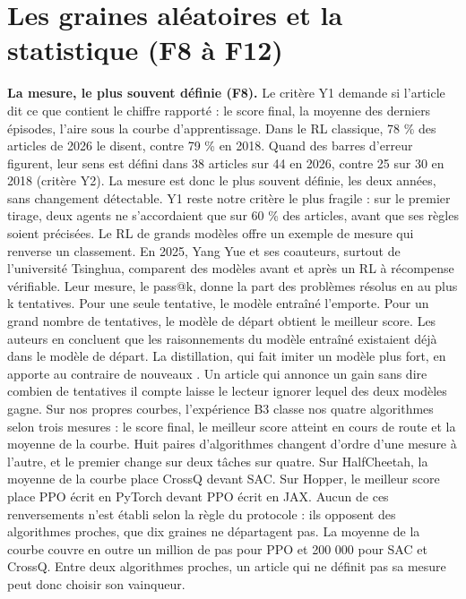 \documentclass[11pt,a4paper]{article}
\begin{document}
\section{Les graines aléatoires et la statistique (F8 à
F12)}\label{les-graines-aluxe9atoires-et-la-statistique-f8-uxe0-f12}

\textbf{La mesure, le plus souvent définie (F8).} Le critère Y1 demande
si l'article dit ce que contient le chiffre rapporté : le score final,
la moyenne des derniers épisodes, l'aire sous la courbe d'apprentissage.
Dans le RL classique, 78 \% des articles de 2026 le disent, contre 79 \%
en 2018. Quand des barres d'erreur figurent, leur sens est défini dans
38 articles sur 44 en 2026, contre 25 sur 30 en 2018 (critère Y2). La
mesure est donc le plus souvent définie, les deux années, sans
changement détectable. Y1 reste notre critère le plus fragile : sur le
premier tirage, deux agents ne s'accordaient que sur 60 \% des articles,
avant que ses règles soient précisées. Le RL de grands modèles offre un
exemple de mesure qui renverse un classement. En 2025, Yang Yue et ses
coauteurs, surtout de l'université Tsinghua, comparent des modèles avant
et après un RL à récompense vérifiable. Leur mesure, le pass@k, donne la
part des problèmes résolus en au plus k tentatives. Pour une seule
tentative, le modèle entraîné l'emporte. Pour un grand nombre de
tentatives, le modèle de départ obtient le meilleur score. Les auteurs
en concluent que les raisonnements du modèle entraîné existaient déjà
dans le modèle de départ. La distillation, qui fait imiter un modèle
plus fort, en apporte au contraire de nouveaux \autocite{yue2025rlvr}.
Un article qui annonce un gain sans dire combien de tentatives il compte
laisse le lecteur ignorer lequel des deux modèles gagne. Sur nos propres
courbes, l'expérience B3 classe nos quatre algorithmes selon trois
mesures : le score final, le meilleur score atteint en cours de route et
la moyenne de la courbe. Huit paires d'algorithmes changent d'ordre
d'une mesure à l'autre, et le premier change sur deux tâches sur quatre.
Sur HalfCheetah, la moyenne de la courbe place CrossQ devant SAC. Sur
Hopper, le meilleur score place PPO écrit en PyTorch devant PPO écrit en
JAX. Aucun de ces renversements n'est établi selon la règle du protocole
: ils opposent des algorithmes proches, que dix graines ne départagent
pas. La moyenne de la courbe couvre en outre un million de pas pour PPO
et 200 000 pour SAC et CrossQ. Entre deux algorithmes proches, un
article qui ne définit pas sa mesure peut donc choisir son vainqueur.
\end{document}
